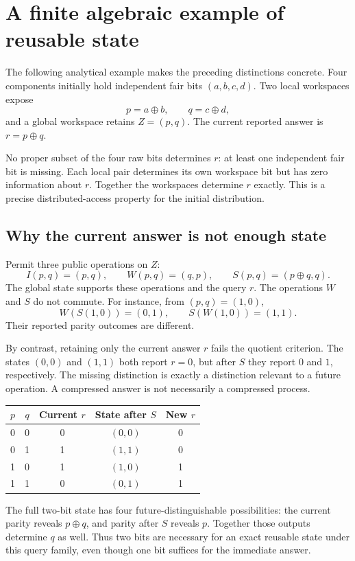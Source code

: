 \documentclass[11pt,letterpaper]{article}
\theoremstyle{plain}
\theoremstyle{definition}
\theoremstyle{remark}
\begin{document}
\section{A finite algebraic example of reusable state}\label{sec:worked}
The following analytical example makes the preceding distinctions concrete. Four components initially hold independent fair bits $(a,b,c,d)$. Two local workspaces expose
\[
p=a\oplus b,\qquad q=c\oplus d,
\]
and a global workspace retains $Z=(p,q)$. The current reported answer is $r=p\oplus q$.

No proper subset of the four raw bits determines $r$: at least one independent fair bit is missing. Each local pair determines its own workspace bit but has zero information about $r$. Together the workspaces determine $r$ exactly. This is a precise distributed-access property for the initial distribution.

\subsection{Why the current answer is not enough state}
Permit three public operations on $Z$:
\[
I(p,q)=(p,q),\qquad W(p,q)=(q,p),\qquad S(p,q)=(p\oplus q,q).
\]
The global state supports these operations and the query $r$. The operations $W$ and $S$ do not commute. For instance, from $(p,q)=(1,0)$,
\[
W(S(1,0))=(0,1),\qquad S(W(1,0))=(1,1).
\]
Their reported parity outcomes are different.

By contrast, retaining only the current answer $r$ fails the quotient criterion. The states $(0,0)$ and $(1,1)$ both report $r=0$, but after $S$ they report $0$ and $1$, respectively. The missing distinction is exactly a distinction relevant to a future operation. A compressed answer is not necessarily a compressed process.

\begin{center}
\begin{tabular}{@{}ccccc@{}}
\toprule
$p$ & $q$ & Current $r$ & State after $S$ & New $r$\\
\midrule
0&0&0&$(0,0)$&0\\
0&1&1&$(1,1)$&0\\
1&0&1&$(1,0)$&1\\
1&1&0&$(0,1)$&1\\
\bottomrule
\end{tabular}
\end{center}

The full two-bit state has four future-distinguishable possibilities: the current parity reveals $p\oplus q$, and parity after $S$ reveals $p$. Together those outputs determine $q$ as well. Thus two bits are necessary for an exact reusable state under this query family, even though one bit suffices for the immediate answer.
\end{document}
